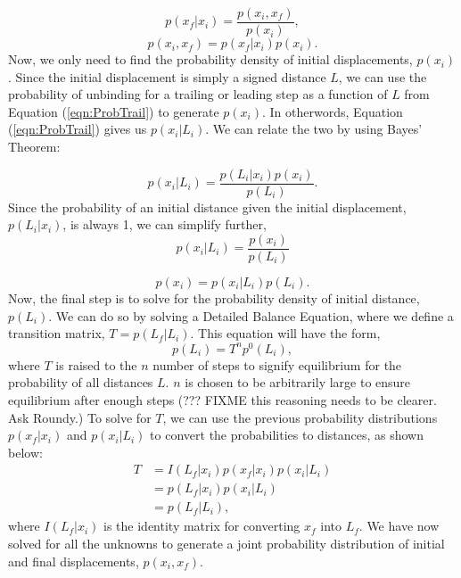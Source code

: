 \[
	p(x_f|x_i)=\frac{p(x_i,x_f)}{p(x_i)},
\]
\begin{equation}
	p(x_i,x_f)=p(x_f|x_i)p(x_i).
\end{equation}
Now, we only need to find the probability density of initial displacements, $p(x_i)$. Since the initial displacement is simply a signed distance $L$, we can use the probability of unbinding for a trailing or leading step as a function of $L$ from Equation (\ref{eqn:ProbTrail}) to generate $p(x_i)$. In otherwords, Equation (\ref{eqn:ProbTrail}) gives us $p(x_i|L_i)$. We can relate the two by using Bayes' Theorem:

\begin{equation}
	p(x_i|L_i)=\frac{p(L_i|x_i)p(x_i)}{p(L_i)}.
\end{equation}
Since the probability of an initial distance given the initial displacement, $p(L_i|x_i)$, is always 1, we can simplify further,
\[
	p(x_i|L_i)=\frac{p(x_i)}{p(L_i)} 
\]

\begin{equation}
	p(x_i)=p(x_i|L_i)p(L_i).
\end{equation}
Now, the final step is to solve for the probability density of initial distance, $p(L_i)$. We can do so by solving a Detailed Balance Equation, where we define a transition matrix, $T=p(L_f|L_i)$. This equation will have the form,
\begin{equation}
	p(L_i)=T^np^0(L_i),
\end{equation}
where $T$ is raised to the $n$ number of steps to signify equilibrium for the probability of all distances $L$. $n$ is chosen to be arbitrarily large to ensure equilibrium after enough steps (??? FIXME this reasoning needs to be clearer. Ask Roundy.) To solve for $T$, we can use the previous probability distributions $p(x_f|x_i)$ and $p(x_i|L_i)$ to convert the probabilities to distances, as shown below:
\begin{align}
	T&=I(L_f|x_i)p(x_f|x_i)p(x_i|L_i)\\
	&=p(L_f|x_i)p(x_i|L_i)\\
	&=p(L_f|L_i),
\end{align}
where $I(L_f|x_i)$ is the identity matrix for converting $x_f$ into $L_f$. We have now solved for all the unknowns to generate a joint probability distribution of initial and final displacements, $p(x_i,x_f)$. 


